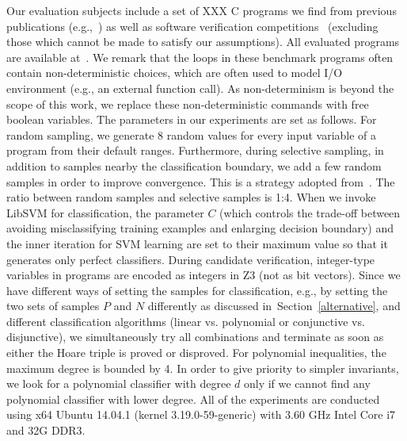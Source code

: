 Our evaluation subjects include a set of XXX C programs we find from previous publications (e.g.,~\cite{DBLP:conf/pldi/GulwaniSV08,sharma2012interpolants,gulavani2008automatically,jeannet2010interproc,isil2013inductive}) as well as software verification competitions~\cite{Dirk:SVCOMP:2016} %
(excluding those which cannot be made to satisfy our assumptions). All evaluated programs are available at~\cite{zilu:repo}. We remark that the loops in these benchmark programs often contain non-deterministic choices, which are often used to model I/O environment (e.g., an external function call). As non-determinism is beyond the scope of this work, we replace these non-deterministic commands with free boolean variables. The parameters in our experiments are set as follows. For random sampling, we generate 8 random values for every input variable of a program from their default ranges. Furthermore, during selective sampling, in addition to samples nearby the classification boundary, we add a few random samples in order to improve convergence. This is a strategy adopted from~\cite{DBLP:conf/icml/SchohnC00}. The ratio between random samples and selective samples is 1:4. When we invoke LibSVM for classification, the parameter $C$ (which controls the trade-off between avoiding misclassifying training examples and enlarging decision boundary) and the inner iteration for SVM learning are set to their maximum value so that it generates only perfect classifiers. During candidate verification, integer-type variables in programs are encoded as integers in Z3 (not as bit vectors). Since we have different ways of setting the samples for classification, e.g., by setting the two sets of samples $P$ and $N$ differently as discussed in~Section~\ref{alternative}, and different classification algorithms (linear vs. polynomial or conjunctive vs. disjunctive), we simultaneously try all combinations and terminate as soon as either the Hoare triple is proved or disproved. For polynomial inequalities, the maximum degree is bounded by 4. In order to give priority to simpler invariants, we look for a polynomial classifier with degree $d$ only if we cannot find any polynomial classifier with lower degree. All of the experiments are conducted using x64 Ubuntu 14.04.1 (kernel 3.19.0-59-generic) with 3.60 GHz Intel Core i7 and 32G DDR3.

